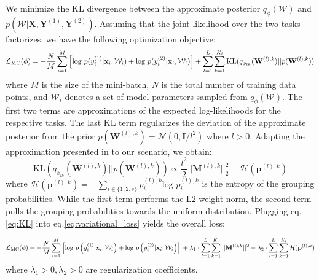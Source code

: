 We minimize the KL divergence between the approximate posterior $q_{\phi}(\mathcal{W})$ and $p(\mathcal{W}|\textbf{X}, \mathbf{Y}^{(1)}, \mathbf{Y}^{(2)})$. Assuming that the joint likelihood over the two tasks factorizes, we have the following optimization objective:
\begin{equation}\label{eq:variational_loss}
\mathcal{L}_{\text{MC}}(\phi) = -\frac{N}{M}\sum_{i=1}^{M} \Big{[}\text{log } p(y^{(1)}_i|\mathbf{x}_i, \mathcal{W}_i) + \text{log }p(y^{(2)}_i|\mathbf{x}_i, \mathcal{W}_i)\Big{]} \\ + \sum_{l=1}^{L}\sum_{k=1}^{K_l}\text{KL}(q_{\phi_{lk}}(\mathbf{W}^{(l),k})||p(\mathbf{W}^{(l),k}))
\end{equation}
where $M$ is the size of the mini-batch, $N$ is the total number of training data points, and $\mathcal{W}_i$ denotes a set of model parameters sampled from $q_{\phi}(\mathcal{W})$. The first two terms are approximations of the expected log-likelihoods for the respective tasks. The last KL term regularizes the deviation of the approximate posterior from the prior $p(\mathbf{W}^{(l),k})=\mathcal{N}(0, \mathbf{I}/l^{2})$ where $l>0$. Adapting the approximation presented in \cite{gal2016uncertainty} to our scenario, we obtain:
\begin{equation}\label{eq:KL}
\text{KL}(q_{\phi_{lk}}(\mathbf{W}^{(l),k})||p(\mathbf{W}^{(l),k})) \propto \frac{l^2}{2}||\mathbf{M}^{(l),k}||^{2}
_{2} - \mathcal{H}(\mathbf{p}^{(l),k})
\end{equation}
where $\mathcal{H}(\mathbf{p}^{(l),k})=-\sum_{i\in \{1,2,s\}}p^{(l),k}_i\text{log }p^{(l),k}_i$ is the entropy of the grouping probabilities. While the first term performs the L2-weight norm, the second term pulls the grouping probabilities towards the uniform distribution. Plugging eq.\eqref{eq:KL} into eq.\eqref{eq:variational_loss} yields the overall loss: 

\begin{equation}\label{eq:total_loss}
\mathcal{L}_{\text{MC}}(\phi) = -\frac{N}{M}\sum_{i=1}^{M} \left[\log\text{\,} p\left(y^{(1)}_i|\mathbf{x}_i, \mathcal{W}_i\right) + \log\text{\,} p\left(y^{(2)}_i|\mathbf{x}_i, \mathcal{W}_i\right)\right] \\ + \lambda_{1} \cdot \sum_{l=1}^{L}\sum_{k=1}^{K_l}||\mathbf{M}^{(l),k}||^{2} - \lambda_{2} \cdot \sum_{l=1}^{L}\sum_{k=1}^{K_l}\mathcal{H}(\mathbf{p}^{(l),k})
\end{equation}
where $\lambda_1>0, \lambda_2>0$ are regularization coefficients. 

